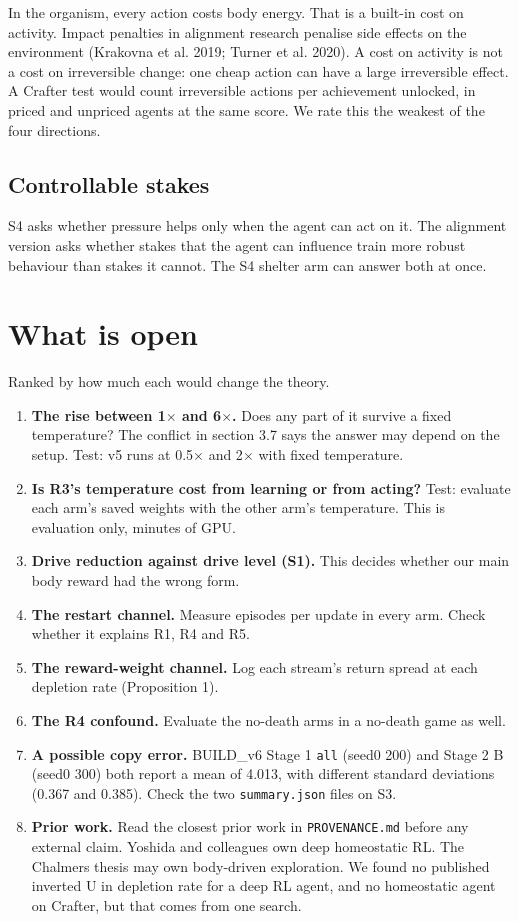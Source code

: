\documentclass[11pt]{article}
\begin{document}
In the organism, every action costs body energy. That is a built-in cost on activity. Impact penalties in alignment research penalise side effects on the environment (Krakovna et al. 2019; Turner et al. 2020). A cost on activity is not a cost on irreversible change: one cheap action can have a large irreversible effect. A Crafter test would count irreversible actions per achievement unlocked, in priced and unpriced agents at the same score. We rate this the weakest of the four directions.

\subsection{Controllable stakes}

S4 asks whether pressure helps only when the agent can act on it. The alignment version asks whether stakes that the agent can influence train more robust behaviour than stakes it cannot. The S4 shelter arm can answer both at once.

\section{What is open}

Ranked by how much each would change the theory.

\begin{enumerate}
\item \textbf{The rise between 1$\times$ and 6$\times$.} Does any part of it survive a fixed temperature? The conflict in section 3.7 says the answer may depend on the setup. Test: v5 runs at 0.5$\times$ and 2$\times$ with fixed temperature.
\item \textbf{Is R3's temperature cost from learning or from acting?} Test: evaluate each arm's saved weights with the other arm's temperature. This is evaluation only, minutes of GPU.
\item \textbf{Drive reduction against drive level (S1).} This decides whether our main body reward had the wrong form.
\item \textbf{The restart channel.} Measure episodes per update in every arm. Check whether it explains R1, R4 and R5.
\item \textbf{The reward-weight channel.} Log each stream's return spread at each depletion rate (Proposition 1).
\item \textbf{The R4 confound.} Evaluate the no-death arms in a no-death game as well.
\item \textbf{A possible copy error.} BUILD\_v6 Stage 1 \texttt{all} (seed0 200) and Stage 2 B (seed0 300) both report a mean of 4.013, with different standard deviations (0.367 and 0.385). Check the two \texttt{summary.json} files on S3.
\item \textbf{Prior work.} Read the closest prior work in \texttt{PROVENANCE.md} before any external claim. Yoshida and colleagues own deep homeostatic RL. The Chalmers thesis may own body-driven exploration. We found no published inverted U in depletion rate for a deep RL agent, and no homeostatic agent on Crafter, but that comes from one search.
\end{enumerate}
\end{document}
